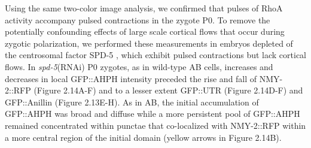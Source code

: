 \documentclass{ucetd}
\begin{document}
Using the same two-color image analysis, we confirmed that pulses of RhoA activity accompany pulsed contractions in the zygote P0. To remove the potentially confounding effects of large scale cortical flows that occur during zygotic polarization, we performed these measurements in embryos depleted of the centrosomal factor SPD-5 \cite{Munro:2004jk, Hamill:2002tw}, which exhibit pulsed contractions but lack cortical flows. In \textit{spd-5}(RNAi) P0 zygotes, as in wild-type AB cells, increases and decreases in local GFP::AHPH intensity preceded the rise and fall of NMY-2::RFP (Figure 2.14A-F) and to a lesser extent GFP::UTR (Figure 2.14D-F) and GFP::Anillin (Figure 2.13E-H).  As in AB, the initial accumulation of GFP::AHPH was broad and diffuse while a more persistent pool of GFP::AHPH remained concentrated within punctae that co-localized with NMY-2::RFP within a more central region of the initial domain (yellow arrows in Figure 2.14B). 
\end{document}
